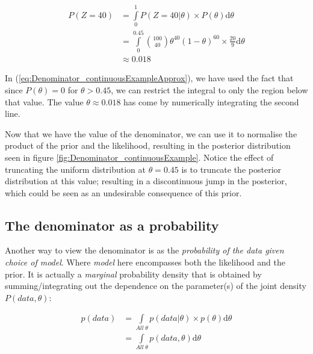 \documentclass[11pt,fullpage]{book}
\begin{document}
\begin{equation}\label{eq:Denominator_continuousExampleApprox}
\begin{align}
P(Z=40) &= \int\limits_{0}^{1} P(Z=40|\theta) \times P(\theta) \mathrm{d}\theta\\
&= \int\limits_{0}^{0.45} {100 \choose 40} \theta^{40} (1-\theta)^{60} \times \frac{20}{9} \mathrm{d}\theta\\
&\approx 0.018
\end{align}
\end{equation}

In (\ref{eq:Denominator_continuousExampleApprox}), we have used the fact that since $P(\theta)=0$ for $\theta>0.45$, we can restrict the integral to only the region below that value. The value $\theta\approx 0.018$ has come by numerically integrating the second line.

Now that we have the value of the denominator, we can use it to normalise the product of the prior and the likelihood, resulting in the posterior distribution seen in figure \ref{fig:Denominator_continuousExample}. Notice the effect of truncating the uniform distribution at $\theta=0.45$ is to truncate the posterior distribution at this value; resulting in a discontinuous jump in the posterior, which could be seen as an undesirable consequence of this prior.

\subsection{The denominator as a probability}\label{sec:Denominator_asAProbability}
Another way to view the denominator is as the \textit{probability of the data given choice of model}. Where \textit{model} here encompasses both the likelihood and the prior. It is actually a \textit{marginal} probability density that is obtained by summing/integrating out the dependence on the parameter(s) of the joint density $P(data,\theta)$:

\begin{equation}\label{eq:Denominator_jointDensity}
\begin{align}
p(data) &= \int\limits_{All\; \theta} p(data|\theta) \times p(\theta)\mathrm{d}\theta\\
& = \int\limits_{All\; \theta} p(data,\theta) \mathrm{d}\theta
\end{align}
\end{equation}
\end{document}
